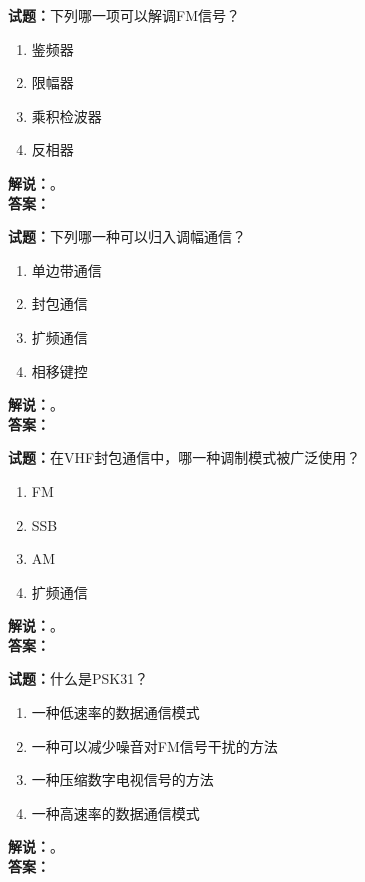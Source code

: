 \documentclass{ctexbook}
\begin{document}
\bigskip




\noindent\textbf{试题：}下列哪一项可以解调FM信号？
\begin{enumerate}[leftmargin=3em]
\item 鉴频器
\item 限幅器
\item 乘积检波器
\item 反相器
\end{enumerate}
\noindent\textbf{解说：}\textbf{}。\\\noindent\textbf{答案：}

\bigskip




\noindent\textbf{试题：}下列哪一种可以归入调幅通信？
\begin{enumerate}[leftmargin=3em]
\item 单边带通信
\item 封包通信
\item 扩频通信
\item 相移键控
\end{enumerate}
\noindent\textbf{解说：}\textbf{}。\\\noindent\textbf{答案：}

\bigskip




\noindent\textbf{试题：}在VHF封包通信中，哪一种调制模式被广泛使用？
\begin{enumerate}[leftmargin=3em]
\item FM
\item SSB
\item AM
\item 扩频通信
\end{enumerate}
\noindent\textbf{解说：}\textbf{}。\\\noindent\textbf{答案：}

\bigskip




\noindent\textbf{试题：}什么是PSK31？
\begin{enumerate}[leftmargin=3em]
\item 一种低速率的数据通信模式
\item 一种可以减少噪音对FM信号干扰的方法
\item 一种压缩数字电视信号的方法
\item 一种高速率的数据通信模式
\end{enumerate}
\noindent\textbf{解说：}\textbf{}。\\\noindent\textbf{答案：}
\end{document}
